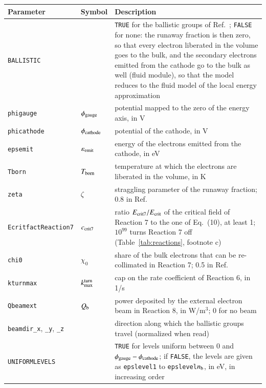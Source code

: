 \documentclass{warpdoc}
\renewcommand{\fontsizetable}{\footnotesize}
\begin{document}
\begin{table}[!ht]
  \center\fontsizetable
  \begin{threeparttable}
    \label{tab:parameters}
    \fontsizetable
    \begin{tabular*}{\textwidth}{@{}l@{\extracolsep{\fill}}lp{}@{}}
    \toprule
    Parameter & Symbol & Description\\
    \midrule
    {\tt BALLISTIC} & & {\tt TRUE} for the ballistic groups of Ref.~\cite{arxiv:2026:parent}; {\tt FALSE} for none: the runaway fraction is then zero, so that every electron liberated in the volume goes to the bulk, and the secondary electrons emitted from the cathode go to the bulk as well (fluid module), so that the model reduces to the fluid model of the local energy approximation\\
    {\tt phigauge} & $\phi_{\rm gauge}$ & potential mapped to the zero of the energy axis, in V\\
    {\tt phicathode} & $\phi_{\rm cathode}$ & potential of the cathode, in V\\
    {\tt epsemit} & $\varepsilon_{\rm emit}$ & energy of the electrons emitted from the cathode, in eV\\
    {\tt Tborn} & $T_{\rm born}$ & temperature at which the electrons are liberated in the volume, in K\\
    {\tt zeta} & $\zeta$ & straggling parameter of the runaway fraction; 0.8 in Ref.~\cite{arxiv:2026:parent}\\
    {\tt EcritfactReaction7} & $c_{\rm crit7}$ & ratio $E_{\rm crit7}/E_{\rm crit}$ of the critical field of Reaction 7 to the one of Eq.~(10), at least 1; $10^{99}$ turns Reaction 7 off (Table~\ref{tab:reactions}, footnote c)\\
    {\tt chi0} & $\chi_0$ & share of the bulk electrons that can be re-collimated in Reaction 7; 0.5 in Ref.~\cite{arxiv:2026:parent}\\
    {\tt kturnmax} & $k^{\rm turn}_{\rm max}$ & cap on the rate coefficient of Reaction 6, in 1/s\\
    {\tt Qbeamext} & $Q_{\rm b}$ & power deposited by the external electron beam in Reaction 8, in W/m$^3$; 0 for no beam\\
    {\tt beamdir\_x}, {\tt \_y}, {\tt \_z} & & direction along which the ballistic groups travel (normalized when read)\\
    {\tt UNIFORMLEVELS} & & {\tt TRUE} for levels uniform between 0 and $\phi_{\rm gauge}-\phi_{\rm cathode}$; if {\tt FALSE}, the levels are given as {\tt epslevel1} to {\tt epslevel}$n_{\rm b}$, in eV, in increasing order\\
    \bottomrule
    \end{tabular*}
   \end{threeparttable}
\end{table}


 \clearpage


\end{document}

